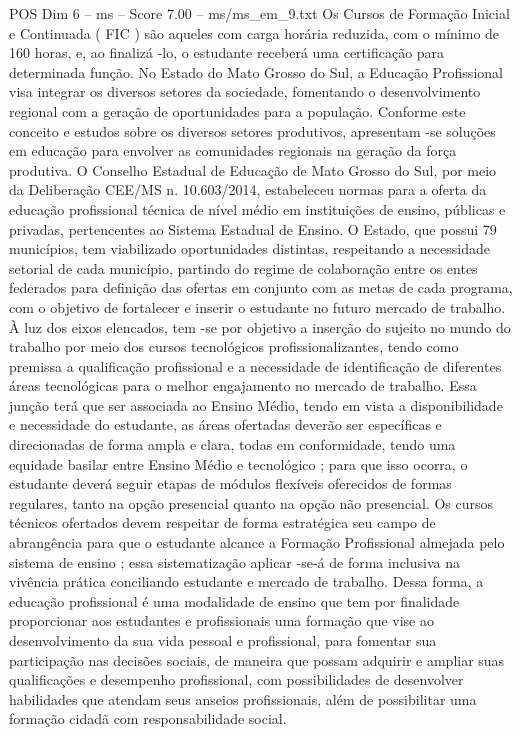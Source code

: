 \begin{textsample}{POS Dim 6 – ms – Score 7.00 – ms/ms\_em\_9.txt}
Os Cursos de Formação Inicial e Continuada ( FIC ) são aqueles com carga horária reduzida, com o mínimo de 160 horas, e, ao finalizá -lo, o estudante receberá uma certificação para determinada função.
No Estado do Mato Grosso do Sul, a Educação Profissional visa integrar os diversos setores da sociedade, fomentando o desenvolvimento regional com a geração de oportunidades para a população.
Conforme este conceito e estudos sobre os diversos setores produtivos, apresentam -se soluções em educação para envolver as comunidades regionais na geração da força produtiva.
O Conselho Estadual de Educação de Mato Grosso do Sul, por meio da Deliberação CEE/MS n. 10.603/2014, estabeleceu normas para a oferta da educação profissional técnica de nível médio em instituições de ensino, públicas e privadas, pertencentes ao Sistema Estadual de Ensino.
O Estado, que possui 79 municípios, tem viabilizado oportunidades distintas, respeitando a necessidade setorial de cada município, partindo do regime de colaboração entre os entes federados para definição das ofertas em conjunto com as metas de cada programa, com o objetivo de fortalecer e inserir o estudante no futuro mercado de trabalho.
À luz dos eixos elencados, tem -se por objetivo a inserção do sujeito no mundo do trabalho por meio dos cursos tecnológicos profissionalizantes, tendo como premissa a qualificação profissional e a necessidade de identificação de diferentes áreas tecnológicas para o melhor engajamento no mercado de trabalho.
Essa junção terá que ser associada ao Ensino Médio, tendo em vista a disponibilidade e necessidade do estudante, as áreas ofertadas deverão ser específicas e direcionadas de forma ampla e clara, todas em conformidade, tendo uma equidade basilar entre Ensino Médio e tecnológico ; para que isso ocorra, o estudante deverá seguir etapas de módulos flexíveis oferecidos de formas regulares, tanto na opção presencial quanto na opção não presencial.
Os cursos técnicos ofertados devem respeitar de forma estratégica seu campo de abrangência para que o estudante alcance a Formação Profissional almejada pelo sistema de ensino ; essa sistematização aplicar -se-á de forma inclusiva na vivência prática conciliando estudante e mercado de trabalho.
Dessa forma, a educação profissional é uma modalidade de ensino que tem por finalidade proporcionar aos estudantes e profissionais uma formação que vise ao desenvolvimento da sua vida pessoal e profissional, para fomentar sua participação nas decisões sociais, de maneira que possam adquirir e ampliar suas qualificações e desempenho profissional, com possibilidades de desenvolver habilidades que atendam seus anseios profissionais, além de possibilitar uma formação cidadã com responsabilidade social.

\end{textsample}
